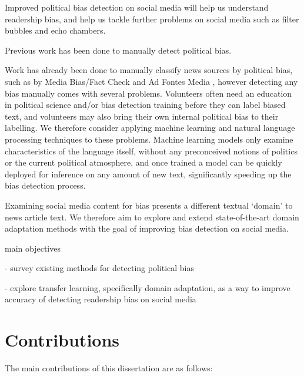 Improved political bias detection on social media will help us understand readership bias, and help us tackle further problems on social media such as filter bubbles and echo chambers.

Previous work has been done to manually detect political bias.

Work has already been done to manually classify news sources by political bias, such as by Media Bias/Fact Check \cite{mbfc} and Ad Fontes Media \cite{media-bias-chart}, however detecting any bias manually comes with several problems. Volunteers often need an education in political science and/or bias detection training before they can label biased text, and volunteers may also bring their own internal political bias to their labelling. We therefore consider applying machine learning and natural language processing techniques to these problems. Machine learning models only examine characteristics of the language itself, without any preconceived notions of politics or the current political atmosphere, and once trained a model can be quickly deployed for inference on any amount of new text, significantly speeding up the bias detection process.

Examining social media content for bias presents a different textual `domain' to news article text. We therefore aim to explore and extend state-of-the-art domain adaptation methods with the goal of improving bias detection on social media.

main objectives

 - survey existing methods for detecting political bias
 
 - explore transfer learning, specifically domain adaptation, as a way to improve accuracy of detecting readership bias on social media

\section{Contributions}

The main contributions of this dissertation are as follows:

